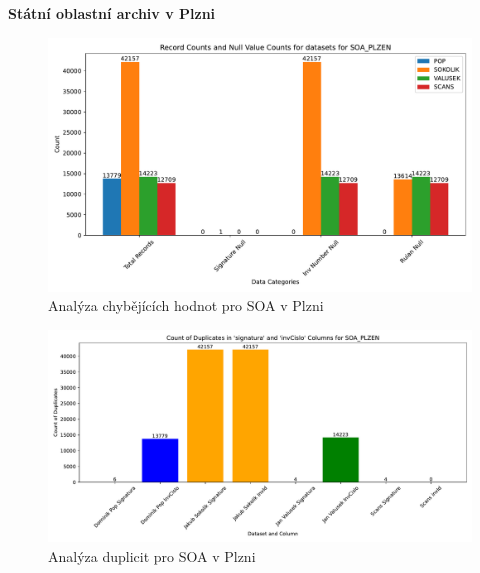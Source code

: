\newpage
\noindent\textbf{Státní oblastní archiv v Plzni}\\

\begin{figure}[htbp]
\centering
    \includegraphics[scale=.5]{obrazky-figures/dataAnalysis/soaPlzen/missingValues.pdf}
    \caption{Analýza chybějících hodnot pro SOA v Plzni}
\end{figure}

\begin{figure}[htbp]
\centering
    \includegraphics[scale=.5]{obrazky-figures/dataAnalysis/soaPlzen/duplicities.pdf}
    \caption{Analýza duplicit pro SOA v Plzni}
\end{figure}

